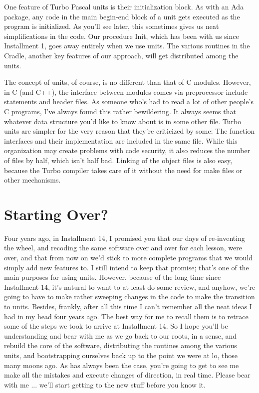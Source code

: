 One feature of Turbo Pascal units is their initialization block. As with an Ada package, any code in the main begin-end block of a unit gets executed as the program is initialized. As you'll see later, this sometimes gives us neat simplifications in the code. Our procedure Init, which has been with us since Installment 1, goes away entirely when we use units. The various routines in the Cradle, another key features of our approach, will get distributed among the units.

The concept of units, of course, is no different than that of C modules. However, in C (and C++), the interface between modules comes via preprocessor include statements and header files. As someone who's had to read a lot of other people's C programs, I've always found this rather bewildering. It always seems that whatever data structure you'd like to know about is in some other file. Turbo units are simpler for the very reason that they're criticized by some:  The function interfaces and their implementation are included in the same file. While this organization may create problems with code security, it also reduces the number of files by half, which isn't half bad. Linking of the object files is also easy, because the Turbo compiler takes care of it without the need for make files or other mechanisms.

\section{Starting Over?}

Four years ago, in Installment 14, I promised you that our days of re-inventing the wheel, and recoding the same software over and over for each lesson, were over, and that from now on we'd stick to more complete programs that we would simply add new features to. I still intend to keep that promise; that's one of the main purposes for using units. However, because of the long time since Installment 14, it's natural to want to at least do some review, and anyhow, we're going to have to make rather sweeping changes in the code to make the transition to units. Besides, frankly, after all this time I can't remember all the neat ideas I had in my head four years ago. The best way for me to recall them is to retrace some of the steps we took to arrive at Installment 14. So I hope you'll be understanding and bear with me as we go back to our roots, in a sense, and rebuild the core of the software, distributing the routines among the various units, and bootstrapping ourselves back up to the point we were at lo, those many moons ago. As has always been the case, you're going to get to see me make all the mistakes and execute changes of direction, in real time. Please bear with me ... we'll start getting to the new stuff before you know it.

